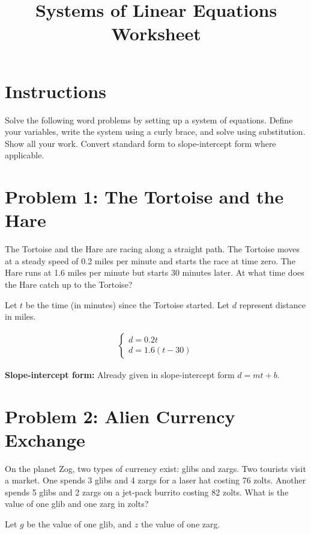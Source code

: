 \documentclass[12pt]{article}
\title{Systems of Linear Equations Worksheet}
\author{}
\date{}
\begin{document}
\maketitle

\section*{Instructions}
Solve the following word problems by setting up a system of equations. Define your variables, write the system using a curly brace, and solve using substitution. Show all your work. Convert standard form to slope-intercept form where applicable.

\section*{Problem 1: The Tortoise and the Hare}
The Tortoise and the Hare are racing along a straight path. The Tortoise moves at a steady speed of 0.2 miles per minute and starts the race at time zero. The Hare runs at 1.6 miles per minute but starts 30 minutes later. At what time does the Hare catch up to the Tortoise?

\vspace{1em}
\noindent Let \( t \) be the time (in minutes) since the Tortoise started. Let \( d \) represent distance in miles.

\begin{align*}
\left\{
  \begin{array}{l}
    d = 0.2t \\ 
    d = 1.6(t - 30)
  \end{array}
\right.
\end{align*}

\vspace{1em}
\noindent\textbf{Slope-intercept form:} Already given in slope-intercept form \( d = mt + b \).

\newpage

\section*{Problem 2: Alien Currency Exchange}
On the planet Zog, two types of currency exist: glibs and zargs. Two tourists visit a market. One spends 3 glibs and 4 zargs for a laser hat costing 76 zolts. Another spends 5 glibs and 2 zargs on a jet-pack burrito costing 82 zolts. What is the value of one glib and one zarg in zolts?

\vspace{1em}
\noindent Let \( g \) be the value of one glib, and \( z \) the value of one zarg.
\end{document}
